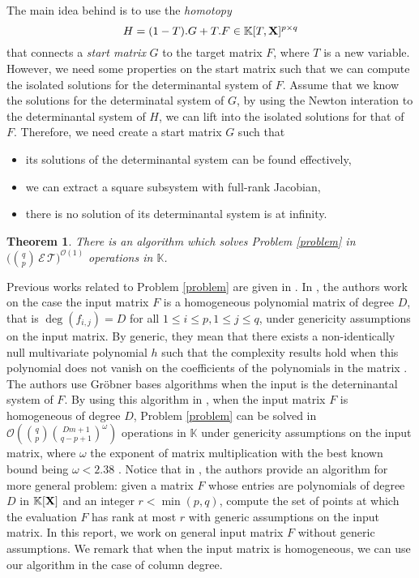 \documentclass[11pt]{article}
\numberwithin{Property}{section}
\newtheorem{Theorem}{Theorem}%
\numberwithin{Theorem}{section}
\numberwithin{Proposition}{section}
\numberwithin{Lemma}{section}
\numberwithin{Corollary}{section}
\numberwithin{Definition}{section}
\numberwithin{Remark}{section}
\numberwithin{Conjecture}{section}
\numberwithin{Problem}{section}
\numberwithin{Claim}{section}
\theoremstyle{definition}
\numberwithin{Example}{section}
\renewcommand{\leq}{\leqslant}
\newcommand{\bigO}[1]{\mathcal{O}(#1)} %
\newcommand{\expmatmul}{\omega} %
\newcommand{\field}{\mathbb{K}} %
\newcommand{\mat}[1]{\mathbf{\MakeUppercase{#1}}} %
\begin{document}
The main idea behind is to use the \emph{homotopy} 
\[H = (1-T).G + T.F \in \field[T, \mat{X}]^{p \times q}\]
that connects a \emph{start matrix} $G$ to the target matrix $F$, where $T$ is a new variable. However, we need some properties on the start matrix such that we can compute the isolated solutions for the determinantal system of $F$. Assume that we know the solutions for the determinatal system of $G$, by using the Newton interation to the determinantal system of $H$, we can lift into the isolated solutions for that of $F$. Therefore, we need create a start matrix $G$ such that
\begin{itemize}
\item its solutions of the determinantal system can be found effectively,
\item we can extract a square subsystem with full-rank Jacobian,
\item there is no solution of its determinantal system is at infinity. 
\end{itemize}
\begin{Theorem} There is an algorithm which solves Problem \ref{problem} in $\big({{q}\choose{p}} \,\mathcal{E}\,\mathcal{T}\big)^{\bigO{1}}$ operations in $\field$.
\end{Theorem}

Previous works related to Problem \ref{problem} are given in \cite{FauSafSpa13, Miller04, Spa14, SaSc16}. In \cite{FauSafSpa13}, the authors work on the case the input matrix $F$ is a homogeneous polynomial matrix of degree $D$, that is $\deg(f_{i,j}) = D$ for all $1 \leq i \leq p, 1 \leq j \leq q$, under genericity assumptions on the input matrix. By generic, they mean that there exists a non-identically null multivariate polynomial $h$ such that the complexity results hold when this polynomial does not vanish on the coefficients of the polynomials in the matrix \cite{FauSafSpa13}. The authors use Gröbner bases algorithms when the input is the deterninantal system of $F$. By using this algorithm in  \cite{FauSafSpa13}, when the input matrix $F$ is homogeneous of degree $D$, Problem \ref{problem} can be solved in $\bigO{{q \choose p}{{Dm+1} \choose {q-p+1}}^{\expmatmul}}$ operations in $\field$ under genericity assumptions on the input matrix, where $\expmatmul$ the exponent of matrix multiplication with the best known bound being $\expmatmul < 2.38$ \cite{CopWin90, LeGall14}. Notice that in \cite{FauSafSpa13}, the authors provide an algorithm for more general problem: given a matrix $F$ whose entries are polynomials of degree $D$ in $\field[\mat{X}]$ and an integer $r < \min(p,q)$, compute the set of points at which the evaluation $F$ has rank at most $r$ with generic assumptions on the input matrix. In this report, we work on general input matrix $F$ without generic assumptions. We remark that when the input matrix is homogeneous, we can use our algorithm in the case of column degree. 
\end{document}
